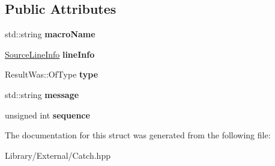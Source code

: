 \subsection*{Public Attributes}
\begin{DoxyCompactItemize}
\item 
\hypertarget{struct_catch_1_1_message_info_a156ade4b3cc731f6ec7b542ae47ba8e3}{}std\+::string {\bfseries macro\+Name}\label{struct_catch_1_1_message_info_a156ade4b3cc731f6ec7b542ae47ba8e3}

\item 
\hypertarget{struct_catch_1_1_message_info_a985165328723e599696ebd8e43195cc5}{}\hyperlink{struct_catch_1_1_source_line_info}{Source\+Line\+Info} {\bfseries line\+Info}\label{struct_catch_1_1_message_info_a985165328723e599696ebd8e43195cc5}

\item 
\hypertarget{struct_catch_1_1_message_info_ae928b9117465c696e45951d9d0284e78}{}Result\+Was\+::\+Of\+Type {\bfseries type}\label{struct_catch_1_1_message_info_ae928b9117465c696e45951d9d0284e78}

\item 
\hypertarget{struct_catch_1_1_message_info_ab6cd06e050bf426c6577502a5c50e256}{}std\+::string {\bfseries message}\label{struct_catch_1_1_message_info_ab6cd06e050bf426c6577502a5c50e256}

\item 
\hypertarget{struct_catch_1_1_message_info_a7f4f57ea21e50160adefce7b68a781d6}{}unsigned int {\bfseries sequence}\label{struct_catch_1_1_message_info_a7f4f57ea21e50160adefce7b68a781d6}

\end{DoxyCompactItemize}


The documentation for this struct was generated from the following file\+:\begin{DoxyCompactItemize}
\item 
Library/\+External/Catch.\+hpp\end{DoxyCompactItemize}
